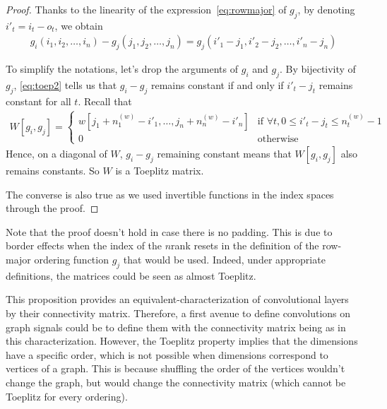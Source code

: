 \begin{proof}
Thanks to the linearity of the expression~\eqref{eq:rowmajor} of $g_j$, by denoting $i'_t = i_t - o_t$, we obtain
\begin{gather}
  g_i(i_1, i_2, \ldots, i_n) - g_j(j_1, j_2, \ldots, j_n) = g_j(i'_1 - j_1, i'_2 - j_2, \ldots, i'_n - j_n)
\label{eq:toep2}
\end{gather}

To simplify the notations, let's drop the arguments of $g_i$ and $g_j$. By bijectivity of $g_j$, \eqref{eq:toep2} tells us that $g_i - g_j$ remains constant if and only if $i'_t - j_t$ remains constant for all $t$. Recall that 
\begin{gather}
  W[g_i,g_j] =
 \begin{cases}
   w[j_1 + n_1^{(w)} - i'_1, \ldots, j_n + n_n^{(w)} - i'_n] & \text{if } \forall t, 0 \le i'_t - j_t \le n_t^{(w)} - 1 \\
   0 & \text{otherwise}
 \end{cases}
\label{eq:toep3}
\end{gather}
Hence, on a diagonal of $W$, $g_i - g_j$ remaining constant means that $W[g_i,g_j]$ also remains constants. So $W$ is a Toeplitz matrix.

The converse is also true as we used invertible functions in the index spaces through the proof.
\end{proof}

\begin{remark}
Note that the proof doesn't hold in case there is no padding. This is due to border effects when the index of the $n$\powth rank resets in the definition of the row-major ordering function $g_j$ that would be used. Indeed, under appropriate definitions, the matrices could be seen as almost Toeplitz.
\end{remark}

This proposition provides an equivalent-characterization of convolutional layers by their connectivity matrix. Therefore, a first avenue to define convolutions on graph signals could be to define them with the connectivity matrix being as in this characterization. However, the Toeplitz property implies that the dimensions have a specific order, which is not possible when dimensions correspond to vertices of a graph. This is because shuffling the order of the vertices wouldn't change the graph, but would change the connectivity matrix (which cannot be Toeplitz for every ordering).


